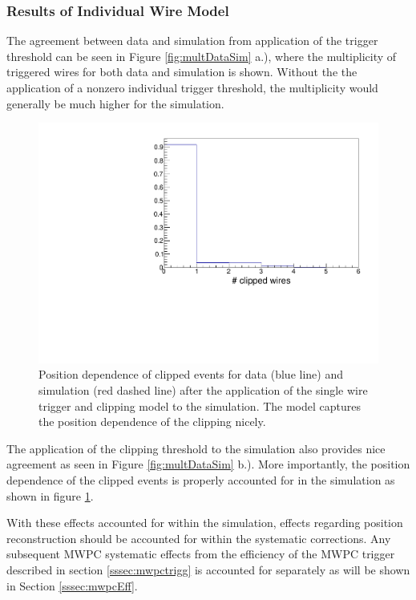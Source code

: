 \subsubsection{Results of Individual Wire Model}

The agreement between data and simulation from application
of the trigger threshold can be seen in Figure \ref{fig:multDataSim} a.), where
the multiplicity of triggered wires for both data and simulation is shown. Without the
the application of a nonzero individual trigger threshold, the multiplicity would
generally be much higher for the simulation.


\begin{figure}[h]
  \centering
  \includegraphics[scale=0.6,page=6]{4-UCNACalibrations/mwpc_position.pdf} 
  \caption{Position dependence of clipped events for data (blue line) and simulation (red dashed line) after
    the application of the single wire trigger and clipping model to the simulation. The model captures the
    position dependence of the clipping nicely.}
  \label{fig:clippedPos}
\end{figure}

The application of the clipping threshold to the simulation also provides nice agreement
as seen in Figure \ref{fig:multDataSim} b.). More importantly, the position dependence
of the clipped events is properly accounted for in the simulation as shown in figure
\ref{fig:clippedPos}.

With these effects accounted for within the simulation, effects regarding position
reconstruction should be accounted for within the systematic corrections. Any subsequent
MWPC systematic effects from the efficiency of the MWPC trigger described in section
\ref{sssec:mwpctrigg} is accounted for separately as will be shown in Section \ref{sssec:mwpcEff}.

